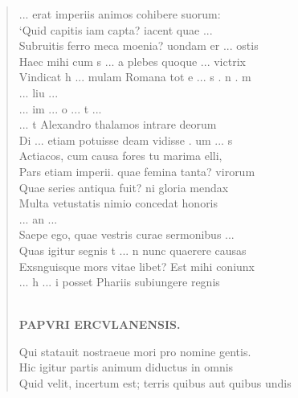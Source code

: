 \documentclass[11pt, a4paper]{report}
\begin{document}
\begin{verse}
                     \lbrack ... \rbrack  erat imperiis animos cohibere suorum: \\ ‘Quid capitis iam capta? iacent quae  \lbrack ... \rbrack 
                 \\ Subruitis ferro meca moenia? uondam er  \lbrack ... \rbrack  ostis \\ Haec mihi cum s  \lbrack ... \rbrack  a plebes quoque  \lbrack ... \rbrack 
                    victrix \\ Vindicat h  \lbrack ... \rbrack  mulam Romana tot e  \lbrack ... \rbrack  s . n .
                    m \\ 
                     \lbrack ... \rbrack  liu  \lbrack ... \rbrack 
                 \\ 
                     \lbrack ... \rbrack  im  \lbrack ... \rbrack  o  \lbrack ... \rbrack  t  \lbrack ... \rbrack 
                 \\ 
                     \lbrack ... \rbrack  t Alexandro thalamos intrare deorum \\ Di  \lbrack ... \rbrack  etiam potuisse deam vidisse . um  \lbrack ... \rbrack 
                    s \\ Actiacos, cum causa fores tu marima elli, \\ Pars etiam imperii. quae femina tanta? virorum \\ Quae series antiqua fuit? ni gloria mendax \\ Multa vetustatis nimio concedat honoris \\ 
                     \lbrack ... \rbrack  an  \lbrack ... \rbrack 
                 \\ Saepe ego, quae vestris curae sermonibus  \lbrack ... \rbrack 
                 \\ Quas igitur segnis t  \lbrack ... \rbrack  n nunc quaerere causas \\ Exsnguisque mors vitae libet? Est mihi coniunx \\ 
                     \lbrack ... \rbrack  h  \lbrack ... \rbrack  i posset Phariis subiungere
                    regnis \\ 
        ﻿\pagebreak 
    \begin{center} \textbf{PAPVRI ERCVLANENSIS.} \end{center}Qui statauit nostraeue mori pro nomine gentis. \\ Hic igitur partis animum diductus in omnis \\ Quid velit, incertum est; terris quibus aut quibus undis \\ 

\end{verse}
\end{document}
